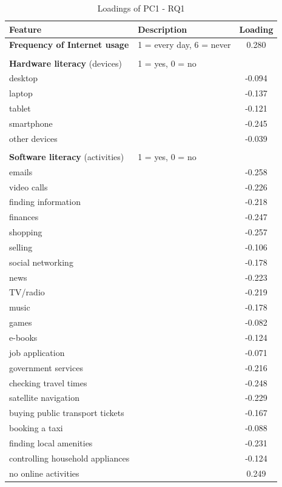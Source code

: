 \begin{table}[h!]
    \centering
    \caption{Loadings of PC1 - RQ1}
    \label{tab:pc1_loadings_rq1}
    \begin{tabular}{llc}
        \toprule
        Feature & Description & Loading \\
        \midrule
        \textbf{Frequency of Internet usage} & 1 = every day, 6 = never & 0.280 \\
        & & \\
        \textbf{Hardware literacy} (devices) & 1 = yes, 0 = no & \\
        desktop &  & -0.094 \\
        laptop &  & -0.137 \\
        tablet &  & -0.121 \\
        smartphone &  & -0.245 \\
        other devices &  & -0.039 \\
        & & \\
        \textbf{Software literacy} (activities) & 1 = yes, 0 = no & \\
        emails &  & -0.258 \\
        video calls &  & -0.226 \\
        finding information &  & -0.218 \\
        finances &  & -0.247 \\
        shopping &  & -0.257 \\
        selling &  & -0.106 \\
        social networking &  & -0.178 \\
        news &  & -0.223 \\
        TV/radio &  & -0.219 \\
        music &  & -0.178 \\
        games &  & -0.082 \\
        e-books &  & -0.124 \\
        job application &  & -0.071 \\
        government services &  & -0.216 \\
        checking travel times &  & -0.248 \\
        satellite navigation &  & -0.229 \\
        buying public transport tickets &  & -0.167 \\
        booking a taxi &  & -0.088 \\
        finding local amenities &  & -0.231 \\
        controlling household appliances &  & -0.124 \\
        no online activities &  & 0.249 \\
        \bottomrule
    \end{tabular}
\end{table}


